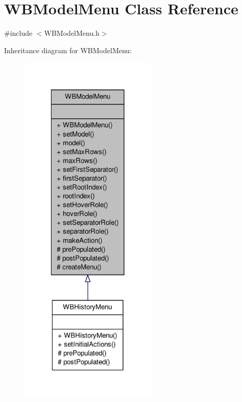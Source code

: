 \hypertarget{class_w_b_model_menu}{\section{W\-B\-Model\-Menu Class Reference}
\label{d9/d88/class_w_b_model_menu}
}


{\ttfamily \#include $<$W\-B\-Model\-Menu.\-h$>$}



Inheritance diagram for W\-B\-Model\-Menu\-:
\nopagebreak
\begin{figure}[H]
\begin{center}
\leavevmode
\includegraphics[width=186pt]{d0/dc9/class_w_b_model_menu__inherit__graph}
\end{center}
\end{figure}


